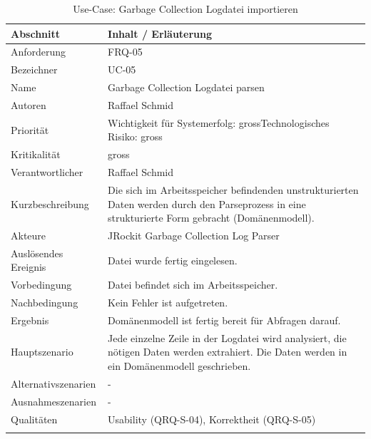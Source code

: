 \begin{longtable}{|p{4cm}|p{10.5cm}|}
\hline
   \textbf{Abschnitt} & \textbf{Inhalt / Erläuterung} \\\hline
   Anforderung & FRQ-05\\\hline
   Bezeichner & UC-05\\\hline
   Name & Garbage Collection Logdatei parsen\\\hline
   Autoren & Raffael Schmid\\\hline
   Priorität & Wichtigkeit für Systemerfolg: gross\newline Technologisches Risiko: gross\\\hline
   Kritikalität & gross\\\hline
   Verantwortlicher & Raffael Schmid\\\hline
   Kurzbeschreibung & Die sich im Arbeitsspeicher befindenden unstrukturierten Daten werden durch den Parseprozess in eine strukturierte Form gebracht (Domänenmodell). \\\hline
   Akteure & JRockit Garbage Collection Log Parser\\\hline
   Auslösendes Ereignis & Datei wurde fertig eingelesen.\\\hline
   Vorbedingung & Datei befindet sich im Arbeitsspeicher.\\\hline
   Nachbedingung & Kein Fehler ist aufgetreten.\\\hline
   Ergebnis & Domänenmodell ist fertig bereit für Abfragen darauf. \\\hline
   Hauptszenario & Jede einzelne Zeile in der Logdatei wird analysiert, die nötigen Daten werden extrahiert. Die Daten werden in ein Domänenmodell geschrieben.
	\\\hline
   Alternativszenarien & -\\\hline
   Ausnahmeszenarien & -\\\hline
   Qualitäten & Usability (QRQ-S-04), Korrektheit (QRQ-S-05)\\\hline
\caption{Use-Case: Garbage Collection Logdatei importieren}
\end{longtable}

